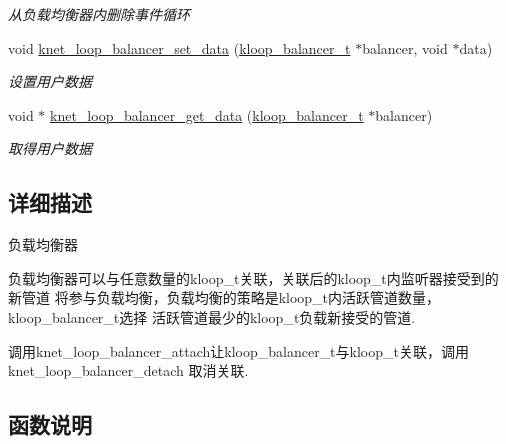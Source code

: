 \begin{DoxyCompactItemize}
\begin{DoxyCompactList}\small\item\em 从负载均衡器内删除事件循环 \end{DoxyCompactList}\item 
void \hyperlink{a00106_ga476aeb9c1ab507c2af581b9ceb66b261_ga476aeb9c1ab507c2af581b9ceb66b261}{knet\+\_\+loop\+\_\+balancer\+\_\+set\+\_\+data} (\hyperlink{a00051_abd3f964265beb2f8984e76f44fb5ea33_abd3f964265beb2f8984e76f44fb5ea33}{kloop\+\_\+balancer\+\_\+t} $\ast$balancer, void $\ast$data)
\begin{DoxyCompactList}\small\item\em 设置用户数据 \end{DoxyCompactList}\item 
void $\ast$ \hyperlink{a00106_gaf4fab99f76529f2381418ff4f0692a68_gaf4fab99f76529f2381418ff4f0692a68}{knet\+\_\+loop\+\_\+balancer\+\_\+get\+\_\+data} (\hyperlink{a00051_abd3f964265beb2f8984e76f44fb5ea33_abd3f964265beb2f8984e76f44fb5ea33}{kloop\+\_\+balancer\+\_\+t} $\ast$balancer)
\begin{DoxyCompactList}\small\item\em 取得用户数据 \end{DoxyCompactList}\end{DoxyCompactItemize}


\subsection{详细描述}
负载均衡器 


\begin{DoxyPre}
负载均衡器可以与任意数量的kloop\_t关联，关联后的kloop\_t内监听器接受到的新管道
将参与负载均衡，负载均衡的策略是kloop\_t内活跃管道数量，kloop\_balancer\_t选择
活跃管道最少的kloop\_t负载新接受的管道.\end{DoxyPre}



\begin{DoxyPre}调用knet\_loop\_balancer\_attach让kloop\_balancer\_t与kloop\_t关联，调用knet\_loop\_balancer\_detach
取消关联.
\end{DoxyPre}
 

\subsection{函数说明}
\hypertarget{a00106_ga647f8a2d39c97c8759f8768ebc612b98_ga647f8a2d39c97c8759f8768ebc612b98}{}
